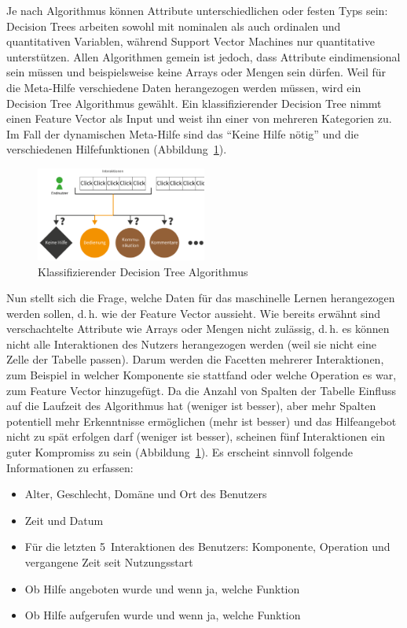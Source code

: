 \documentclass[
	headsepline,
	footsepline,
	fontsize=12pt,
	bibliography=totoc
]{scrbook}
\begin{document}
Je nach Algorithmus können Attribute unterschiedlichen oder festen Typs sein: Decision Trees arbeiten sowohl mit nominalen als auch ordinalen und quantitativen Variablen, während Support Vector Machines nur quantitative unterstützen. Allen Algorithmen gemein ist jedoch, dass Attribute eindimensional sein müssen und beispielsweise keine Arrays oder Mengen sein dürfen. Weil für die Meta-Hilfe verschiedene Daten herangezogen werden müssen, wird ein Decision Tree Algorithmus gewählt. Ein klassifizierender Decision Tree nimmt einen Feature Vector als Input und weist ihn einer von mehreren Kategorien zu. Im Fall der dynamischen Meta-Hilfe sind das \enquote{Keine Hilfe nötig} und die verschiedenen Hilfefunktionen (Abbildung~\ref{figure:sml-ziel}).

\begin{figure}[htbp]
   \centering
   \includegraphics[width=0.5\textwidth]{images/konzeption-sml-ziel.png}
   \caption{Klassifizierender Decision Tree Algorithmus}
   \label{figure:sml-ziel}
\end{figure}


Nun stellt sich die Frage, welche Daten für das maschinelle Lernen herangezogen werden sollen, d.\,h. wie der Feature Vector aussieht. Wie bereits erwähnt sind verschachtelte Attribute wie Arrays oder Mengen nicht zulässig, d.\,h. es können nicht alle Interaktionen des Nutzers herangezogen werden (weil sie nicht eine Zelle der Tabelle passen). Darum werden die Facetten mehrerer Interaktionen, zum Beispiel in welcher Komponente sie stattfand oder welche Operation es war, zum Feature Vector hinzugefügt. Da die Anzahl von Spalten der Tabelle Einfluss auf die Laufzeit des Algorithmus hat (weniger ist besser), aber mehr Spalten potentiell mehr Erkenntnisse ermöglichen (mehr ist besser) und das Hilfeangebot nicht zu spät erfolgen darf (weniger ist besser), scheinen fünf Interaktionen ein guter Kompromiss zu sein (Abbildung~\ref{figure:sml-ziel}). Es erscheint sinnvoll folgende Informationen zu erfassen:

\begin{itemize}
	\item Alter, Geschlecht, Domäne und Ort des Benutzers
	\item Zeit und Datum
	\item Für die letzten 5~Interaktionen des Benutzers: Komponente, Operation und vergangene Zeit seit Nutzungsstart
	\item Ob Hilfe angeboten wurde und wenn ja, welche Funktion
	\item Ob Hilfe aufgerufen wurde und wenn ja, welche Funktion
\end{itemize}
\end{document}
